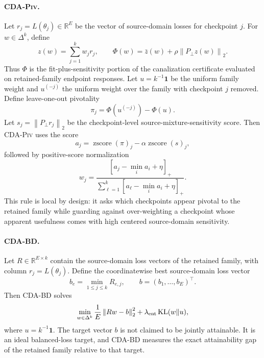 \documentclass{article}
\theoremstyle{definition}
\newcommand{\RR}{\mathbb{R}}
\newcommand{\simplex}{\Delta}
\newcommand{\one}{\mathbf{1}}
\newcommand{\piv}{\textup{\textsc{CDA-Piv}}}
\newcommand{\bd}{\textup{\textsc{CDA-BD}}}
\newcommand{\KL}{\operatorname{KL}}
\newcommand{\norm}[1]{\left\lVert #1 \right\rVert}
\begin{document}
\paragraph{\piv{}.}
Let \(r_j=L(\theta_j)\in\RR^E\) be the vector of source-domain losses for checkpoint \(j\). For \(w\in\simplex^k\), define
\[
z(w)=\sum_{j=1}^k w_j r_j,
\qquad
\Phi(w)=\bar z(w)+\rho\norm{P_\perp z(w)}_2.
\]
Thus \(\Phi\) is the fit-plus-sensitivity portion of the canalization certificate evaluated on retained-family endpoint responses. Let \(u=k^{-1}\one\) be the uniform family weight and \(u^{(-j)}\) the uniform weight over the family with checkpoint \(j\) removed. Define leave-one-out pivotality
\begin{equation}
\pi_j=\Phi(u^{(-j)})-\Phi(u).
\label{eq:pivotality}
\end{equation}
Let \(s_j=\norm{P_\perp r_j}_2\) be the checkpoint-level source-mixture-sensitivity score. Then \piv{} uses the score
\begin{equation}
a_j=\operatorname{zscore}(\pi)_j - \alpha \operatorname{zscore}(s)_j,
\label{eq:piv_score}
\end{equation}
followed by positive-score normalization
\begin{equation}
w_j
=
\frac{[a_j-\min_i a_i+\eta]_+}{\sum_{\ell=1}^k [a_\ell-\min_i a_i+\eta]_+}.
\label{eq:piv_weight}
\end{equation}
This rule is local by design: it asks which checkpoints appear pivotal to the retained family while guarding against over-weighting a checkpoint whose apparent usefulness comes with high centered source-domain sensitivity.

\paragraph{\bd{}.}
Let \(R\in\RR^{E\times k}\) contain the source-domain loss vectors of the retained family, with column \(r_j=L(\theta_j)\). Define the coordinatewise best source-domain loss vector
\begin{equation}
b_e=\min_{1\le j\le k}R_{e,j},
\qquad
b=(b_1,\dots,b_E)^\top.
\label{eq:blackwell_target}
\end{equation}
Then \bd{} solves
\begin{equation}
\min_{w\in\simplex^k}
\frac{1}{E}\norm{Rw-b}_2^2
+ \lambda_{\rm ent}\KL(w\|u),
\label{eq:bd_objective}
\end{equation}
where \(u=k^{-1}\one\). The target vector \(b\) is not claimed to be jointly attainable. It is an ideal balanced-loss target, and \bd{} measures the exact attainability gap of the retained family relative to that target.
\end{document}
